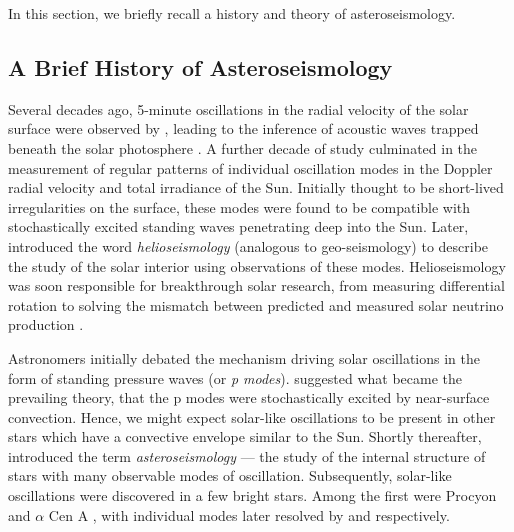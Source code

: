 In this section, we briefly recall a history and theory of asteroseismology. 

\subsection{A Brief History of Asteroseismology}

Several decades ago, 5-minute oscillations in the radial velocity of the solar surface were observed by \citet{Leighton.Noyes.ea1962}, leading to the inference of acoustic waves trapped beneath the solar photosphere \citep{Ulrich1970}. A further decade of study culminated in the measurement of regular patterns of individual oscillation modes in the Doppler radial velocity \citep{Claverie.Isaak.ea1979} and total irradiance \citep{Woodard.Hudson1983a} of the Sun. Initially thought to be short-lived irregularities on the surface, these modes were found to be compatible with stochastically excited standing waves penetrating deep into the Sun. Later, \citet{Deubner.Gough1984} introduced the word \emph{helioseismology} (analogous to geo-seismology) to describe the study of the solar interior using observations of these modes. Helioseismology was soon responsible for breakthrough solar research, from measuring differential rotation \citep{Deubner.Ulrich.ea1979} to solving the mismatch between predicted and measured solar neutrino production \citep{Bahcall.Ulrich1988}.

Astronomers initially debated the mechanism driving solar oscillations in the form of standing pressure waves (or \emph{p modes}). \citet{Goldreich.Keeley1977} suggested what became the prevailing theory, that the p modes were stochastically excited by near-surface convection. Hence, we might expect solar-like oscillations to be present in other stars which have a convective envelope similar to the Sun. Shortly thereafter, \citet{Christensen-Dalsgaard1984} introduced the term \emph{asteroseismology} --- the study of the internal structure of stars with many observable modes of oscillation. Subsequently, solar-like oscillations were discovered in a few bright stars. Among the first were Procyon and \(\alpha\) Cen A \citep{Gelly.Grec.ea1986}, with individual modes later resolved by \citet{Martic.Schmitt.ea1999} and \citet{Bouchy.Carrier2001} respectively.

